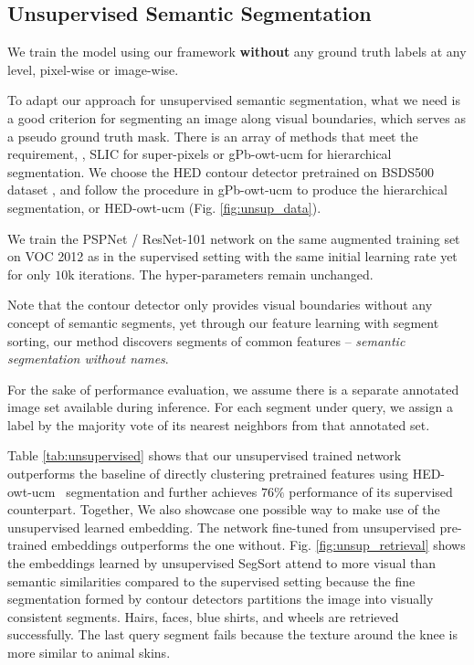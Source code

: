 \documentclass[10pt,twocolumn,letterpaper]{article}
\begin{document}
\subsection{Unsupervised Semantic Segmentation}
\label{sec:exp_unsupervised}


We train the model using our framework {\bf without} any ground truth labels at any level, pixel-wise or image-wise. 

To adapt our approach for unsupervised semantic segmentation, what we need is a good criterion for segmenting an image along visual boundaries, which serves as a pseudo ground truth mask. There is an array of methods that meet the requirement, \eg, SLIC \cite{achanta2012slic} for super-pixels or gPb-owt-ucm \cite{arbelaez2011contour} for hierarchical segmentation. We choose the HED contour detector \cite{xie2015holistically} pretrained on BSDS500 dataset \cite{arbelaez2011contour}, and follow the procedure in gPb-owt-ucm \cite{arbelaez2011contour} to produce the hierarchical segmentation, or HED-owt-ucm (Fig. \ref{fig:unsup_data}).


We train the PSPNet / ResNet-101 network on the same augmented training set on VOC 2012 as in the supervised setting with the same initial learning rate yet for only $10$k iterations. The hyper-parameters remain unchanged.

Note that the contour detector only provides visual boundaries without any concept of semantic segments, yet through our feature learning with segment sorting, our method discovers segments of common features -- {\it semantic segmentation without names}.

For the sake of performance evaluation, we assume there is a separate annotated image set available during inference. For each segment under query, we assign a label by  the  majority  vote  of  its  nearest  neighbors  from that annotated set. 

Table \ref{tab:unsupervised} shows that our unsupervised trained network outperforms the baseline of directly clustering pretrained features using HED-owt-ucm~\cite{xie2015holistically} segmentation and further achieves $76\%$ performance of its supervised counterpart. Together, We also showcase one possible way to make use of the unsupervised learned embedding. The network fine-tuned from unsupervised pre-trained embeddings outperforms the one without. 
Fig. \ref{fig:unsup_retrieval} shows the embeddings learned by unsupervised SegSort attend to more visual than semantic similarities compared to the supervised setting because the fine segmentation formed by contour detectors partitions the image into visually consistent segments. Hairs, faces, blue shirts, and wheels are retrieved successfully. The last query segment fails because the texture around the knee is more similar to animal skins. \\
\end{document}
